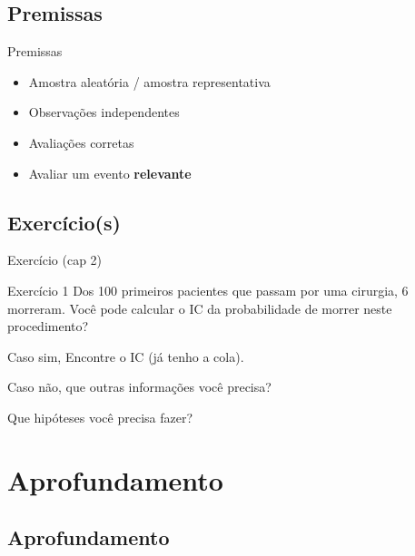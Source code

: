 \documentclass{beamer}
\begin{document}
\subsection{Premissas}

\begin{frame}{\scriptsize Premissas}
  \begin{itemize}
    \footnotesize
  \item Amostra aleatória / amostra representativa
  \item Observações independentes
  \item Avaliações corretas
  \item Avaliar um evento {\bf relevante}
  \end{itemize}
\end{frame}

\subsection{Exercício(s)}

\begin{frame}{\scriptsize Exercício (cap 2)}
  \begin{block}{Exercício 1}
    \footnotesize
    Dos 100 primeiros pacientes que passam por uma cirurgia, 6 morreram.
    Você pode calcular o IC da probabilidade de morrer neste procedimento?

    Caso sim, Encontre o IC (já tenho a cola).

    Caso não, que outras informações você precisa?

    Que hipóteses você precisa fazer?
  \end{block}
\end{frame}

\section{Aprofundamento}

\subsection{Aprofundamento}
\end{document}
